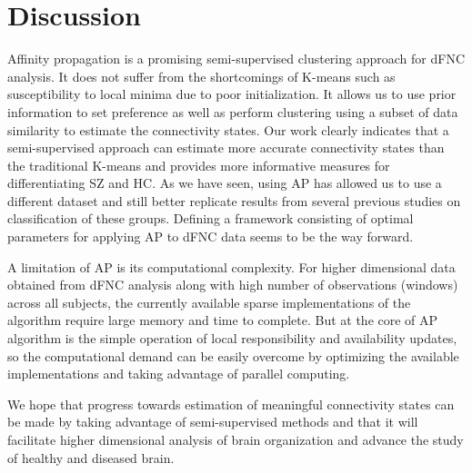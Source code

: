 \documentclass{article}
\begin{document}
\section{Discussion}
\label{sec:Discussion}

Affinity propagation is a promising semi-supervised clustering approach for \ac{dFNC} analysis. It does not suffer from the shortcomings of K-means such as susceptibility to local minima due to poor initialization. It allows us to use prior information to set preference as well as perform clustering using a subset of data similarity to estimate the connectivity states. Our work clearly indicates that a semi-supervised approach can estimate more accurate connectivity states than the traditional K-means and provides more informative measures for differentiating \ac{SZ} and \ac{HC}. As we have seen, using \ac{AP} has allowed us to use a different dataset and still better replicate results from several previous studies on classification of these groups. Defining a framework consisting of optimal parameters for applying \ac{AP} to \ac{dFNC} data seems to be the way forward.

A limitation of \ac{AP} is its computational complexity. For higher dimensional data obtained from \ac{dFNC} analysis along with high number of observations (windows) across all subjects, the currently available sparse implementations of the algorithm require large memory and time to complete. But at the core of \ac{AP} algorithm is the simple operation of local responsibility and availability updates, so the computational demand can be easily overcome by optimizing the available implementations and taking advantage of parallel computing.

We hope that progress towards estimation of meaningful connectivity states can be made by taking advantage of semi-supervised methods and that it will facilitate higher dimensional analysis of brain organization and advance the study of healthy and diseased brain.

\vfill\pagebreak



\end{document}
